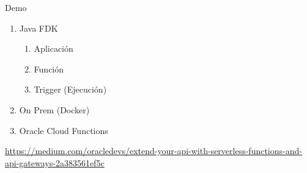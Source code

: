 \documentclass[aspectratio=169]{beamer}
\begin{document}
\begin{frame}{Demo}
	\begin{enumerate}
		\item Java FDK
        	\begin{enumerate}
        		\item Aplicación
        		\item Función
                \item Trigger (Ejecución)
        	\end{enumerate}
		\item On Prem (Docker)
        \item Oracle Cloud Functions
	\end{enumerate}
    {\scriptsize \url{https://medium.com/oracledevs/extend-your-api-with-serverless-functions-and-api-gateways-2a383561ef5c}}
    
\end{frame}
\end{document}
